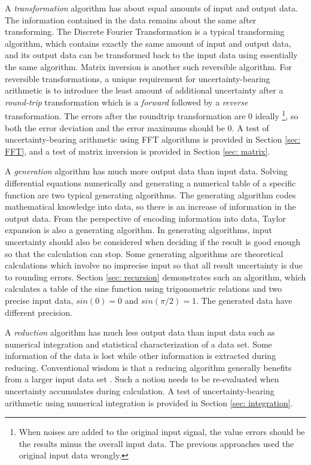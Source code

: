 \documentclass[twoside]{article}
\numberwithin{equation}{section}
\begin{document}
A \emph{transformation} algorithm has about equal amounts of input and output data.  
The information contained in the data remains about the same after transforming.  
The Discrete Fourier Transformation is a typical transforming algorithm, which contains exactly the same amount of input and output data, and its output data can be transformed back to the input data using essentially the same algorithm.  
Matrix inversion is another such reversible algorithm.  
For reversible transformations, a unique requirement for uncertainty-bearing arithmetic is to introduce the least amount of additional uncertainty after a \emph{round-trip} transformation which is a \emph{forward} followed by a \emph{reverse} transformation.  
The errors after the roundtrip transformation are $0$ ideally \footnote{When noises are added to the original input signal, the value errors should be the results minus the overall input data. The previous approaches \cite{Prev_Precision_Arithmetic} used the original input data wrongly.}, so both the error deviation and the error maximums should be $0$.
A test of uncertainty-bearing arithmetic using FFT algorithms is provided in Section \ref{sec: FFT}, and a test of matrix inversion is provided in Section \ref{sec: matrix}.

A \emph{generation} algorithm has much more output data than input data.  
Solving differential equations numerically and generating a numerical table of a specific function are two typical generating algorithms.  
The generating algorithm codes mathematical knowledge into data, so there is an increase of information in the output data.  
From the perspective of encoding information into data, Taylor expansion is also a generating algorithm. 
In generating algorithms, input uncertainty should also be considered when deciding if the result is good enough so that the calculation can stop.  
Some generating algorithms are theoretical calculations which involve no imprecise input so that all result uncertainty is due to rounding errors.  
Section \ref{sec: recursion} demonstrates such an algorithm, which calculates a table of the sine function using trigonometric relations and two precise input data, $sin(0)=0$ and $sin(\pi/2)=1$.  
The generated data have different precision.

A \emph{reduction} algorithm has much less output data than input data such as numerical integration and statistical characterization of a data set.  
Some information of the data is lost while other information is extracted during reducing.  
Conventional wisdom is that a reducing algorithm generally benefits from a larger input data set \cite{Probability_Statistics}.  
Such a notion needs to be re-evaluated when uncertainty accumulates during calculation.  
A test of uncertainty-bearing arithmetic using numerical integration is provided in Section \ref{sec: integration}.
\end{document}
